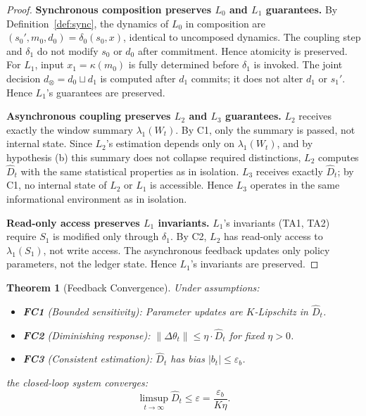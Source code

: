 \documentclass[11pt]{article}
\newtheorem{theorem}{Theorem}[section]
\newcommand{\Dhat}{\widehat{D}}
\newcommand{\State}[1]{S_{#1}}
\newcommand{\Trans}[1]{\delta_{#1}}
\newcommand{\Sum}[1]{\lambda_{#1}}
\newcommand{\Layer}[1]{L_{#1}}
\newcommand{\join}{\sqcup}
\begin{document}
\begin{proof}
\textbf{Synchronous composition preserves $\Layer{0}$ and $\Layer{1}$ guarantees.}
By Definition~\ref{def:sync}, the dynamics of $\Layer{0}$ in composition are $(s_0', m_0, d_0) = \Trans{0}(s_0, x)$, identical to uncomposed dynamics. The coupling step and $\Trans{1}$ do not modify $s_0$ or $d_0$ after commitment. Hence atomicity is preserved. For $\Layer{1}$, input $x_1 = \kappa(m_0)$ is fully determined before $\Trans{1}$ is invoked. The joint decision $d_\otimes = d_0 \join d_1$ is computed after $d_1$ commits; it does not alter $d_1$ or $s_1'$. Hence $\Layer{1}$'s guarantees are preserved.

\textbf{Asynchronous coupling preserves $\Layer{2}$ and $\Layer{3}$ guarantees.}
$\Layer{2}$ receives exactly the window summary $\Sum{1}(W_t)$. By C1, only the summary is passed, not internal state. Since $\Layer{2}$'s estimation depends only on $\Sum{1}(W_t)$, and by hypothesis (b) this summary does not collapse required distinctions, $\Layer{2}$ computes $\Dhat_t$ with the same statistical properties as in isolation. $\Layer{3}$ receives exactly $\Dhat_t$; by C1, no internal state of $\Layer{2}$ or $\Layer{1}$ is accessible. Hence $\Layer{3}$ operates in the same informational environment as in isolation.

\textbf{Read-only access preserves $\Layer{1}$ invariants.}
$\Layer{1}$'s invariants (TA1, TA2) require $\State{1}$ is modified only through $\Trans{1}$. By C2, $\Layer{2}$ has read-only access to $\Sum{1}(\State{1})$, not write access. The asynchronous feedback updates only policy parameters, not the ledger state. Hence $\Layer{1}$'s invariants are preserved.
\end{proof}

\begin{theorem}[Feedback Convergence]
\label{thm:convergence}
Under assumptions:
\begin{itemize}[noitemsep]
  \item \textbf{FC1} (Bounded sensitivity): Parameter updates are $K$-Lipschitz in $\Dhat_t$.
  \item \textbf{FC2} (Diminishing response): $\|\Delta\theta_t\| \le \eta \cdot \Dhat_t$ for fixed $\eta > 0$.
  \item \textbf{FC3} (Consistent estimation): $\Dhat_t$ has bias $|b_t| \le \varepsilon_b$.
\end{itemize}
the closed-loop system converges:
\[
  \limsup_{t \to \infty} \Dhat_t \le \varepsilon = \frac{\varepsilon_b}{K\eta}.
\]
\end{theorem}
\end{document}
